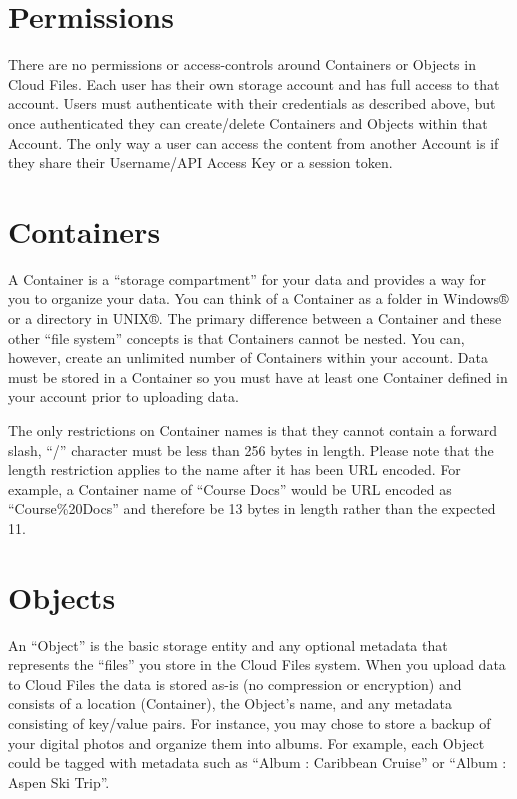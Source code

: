 \documentclass[letterpaper,10pt,english]{manual}
\begin{document}
\section{Permissions}

There are no permissions or access-controls around Containers or Objects
in Cloud Files.  Each user has their own storage account and has full
access to that account. Users must authenticate with their credentials as
described above, but once authenticated they can create/delete Containers
and Objects within that Account.  The only way a user can access the
content from another Account is if they share their Username/API Access
Key or a session token.


\section{Containers}

A Container is a “storage compartment” for your data and provides a way
for you to organize your data. You can think of a Container as a folder
in Windows® or a directory in UNIX®. The primary difference between a
Container and these other “file system” concepts is that Containers cannot
be nested. You can, however, create an unlimited number of Containers
within your account.  Data must be stored in a Container so you must have
at least one Container defined in your account prior to uploading data.

The only restrictions on Container names is that they cannot contain a
forward slash, “/” character must be less than 256 bytes in length.
Please note that the length restriction applies to the name after it has
been URL encoded.  For example, a Container name of “Course Docs” would be
URL encoded as “Course\%20Docs” and therefore be 13 bytes in length rather
than the expected 11.


\section{Objects}

An “Object” is the basic storage entity and any optional metadata that
represents the “files” you store in the Cloud Files system. When you
upload data to Cloud Files the data is stored as-is (no compression or
encryption) and consists of a location (Container), the Object's name,
and any metadata consisting of key/value pairs. For instance, you may
chose to store a backup of your digital photos and organize them into
albums.  For example, each Object could be tagged with metadata such as
“Album : Caribbean Cruise” or “Album : Aspen Ski Trip”.
\end{document}
